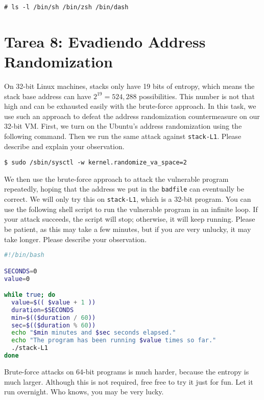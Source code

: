 \begin{lstlisting}
# ls -l /bin/sh /bin/zsh /bin/dash
\end{lstlisting}
 


\section{Tarea 8: Evadiendo Address Randomization}

On 32-bit Linux machines, stacks only have 19 bits of entropy, which means the stack base
address can have $2^{19} = 524,288$ possibilities.  This number is not that high and can be
exhausted easily with the brute-force approach. In this task,
we use such an approach to defeat the address randomization countermeasure 
on our 32-bit VM. 
First, we turn on the Ubuntu's address randomization using the 
following command. Then we run the same attack
against \texttt{stack-L1}.
Please describe and explain your observation.

\begin{lstlisting}
$ sudo /sbin/sysctl -w kernel.randomize_va_space=2
\end{lstlisting}


We then use the brute-force approach to attack the vulnerable program repeatedly, hoping that 
the address we put in the \texttt{badfile} can eventually be correct. We will only try
this on \texttt{stack-L1}, which is a 32-bit program. 
You can use the following shell script to run the vulnerable program in an infinite loop. If your
attack succeeds, the script will stop; otherwise, it will keep running. Please be patient,
as this may take a few minutes, but if you are very unlucky,
it may take longer. Please describe your observation.


\begin{lstlisting}[language=bash]
#!/bin/bash

SECONDS=0
value=0

while true; do
  value=$(( $value + 1 ))
  duration=$SECONDS
  min=$(($duration / 60))
  sec=$(($duration % 60))
  echo "$min minutes and $sec seconds elapsed."
  echo "The program has been running $value times so far."
  ./stack-L1
done
\end{lstlisting}


Brute-force attacks on 64-bit programs is much harder, because the entropy
is much larger. Although this is not required, free free to try it just for fun. 
Let it run overnight. Who knows, you may be very lucky. 


